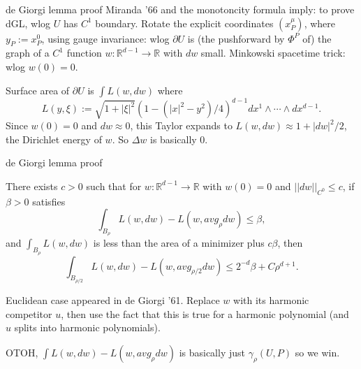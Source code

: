 \documentclass[10pt]{beamer}
\newcommand{\RR}{\mathbb{R}}
\begin{document}
\begin{frame}{de Giorgi lemma proof}
    Miranda '66 and the monotoncity formula imply: to prove dGL, wlog $U$ has $C^1$ boundary. \pause
    Rotate the explicit coordinates $(x^\mu_P)$, where $y_P := x^0_P$, using gauge invariance: wlog $\partial U$ is (the pushforward by $\Phi^P$ of) the graph of a $C^1$ function $w: \RR^{d - 1} \to \RR$ with $dw$ small. \pause Minkowski spacetime trick: wlog $w(0) = 0$.

    Surface area of $\partial U$ is $\int L(w, dw)$ where 
    $$L(y, \xi) := \sqrt{1 + |\xi|^2}{(1 - (|x|^2 - y^2)/4)^{d - 1}} dx^1 \wedge \cdots \wedge dx^{d - 1}.$$\pause
    Since $w(0) = 0$ and $dw \approx 0$, this Taylor expands to $L(w, dw) \approx 1 + |dw|^2/2$, the Dirichlet energy of $w$.
    So $\Delta w$ is basically $0$.
\end{frame}

\begin{frame}{de Giorgi lemma proof}
\begin{lemma}
There exists $c > 0$ such that for $w: \RR^{d - 1} \to \RR$ with $w(0) = 0$ and $||dw||_{C^0} \leq c$, if $\beta > 0$ satisfies
$$\int_{B_\rho} L(w, dw) - L(w, avg_\rho dw) \leq \beta,$$
and $\int_{B_\rho} L(w, dw)$ is less than the area of a minimizer plus $c \beta$, \pause then 
$$\int_{B_{\rho/2}} L(w, dw) - L(w, avg_{\rho/2} dw) \leq 2^{-d} \beta + C\rho^{d + 1}.$$ 
\end{lemma}

Euclidean case appeared in de Giorgi '61.
Replace $w$ with its harmonic competitor $u$, then use the fact that this is true for a harmonic polynomial (and $u$ splits into harmonic polynomials).\pause 

OTOH, $\int L(w, dw) - L(w, avg_\rho dw)$ is basically just $\gamma_\rho(U, P)$ so we win.
\end{frame}
\end{document}
